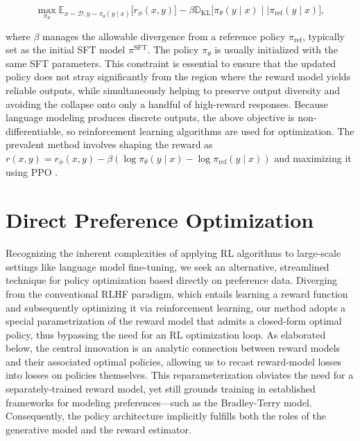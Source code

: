 \begin{equation}\label{eq:RL}
\max_{\pi_{\theta}}  \mathbb{E}_{x\sim \mathcal{D}, y\sim \pi_{\theta}(y \mid x)}\bigl[r_{\phi}(x, y)\bigr] - \beta\mathbb{D}_{\textrm{KL}}\bigl[\pi_{\theta}(y\mid x)\mid \mid \pi_\text{ref}(y\mid x)\bigr],
\end{equation}

where $\beta$ manages the allowable divergence from a reference policy $\pi_\text{ref}$, typically set as the initial SFT model $\pi^\text{SFT}$. The policy $\pi_\theta$ is usually initialized with the same SFT parameters. This constraint is essential to ensure that the updated policy does not stray significantly from the region where the reward model yields reliable outputs, while simultaneously helping to preserve output diversity and avoiding the collapse onto only a handful of high-reward responses. Because language modeling produces discrete outputs, the above objective is non-differentiable, so reinforcement learning algorithms are used for optimization. The prevalent method \citep{ziegler2020finetuning, stiennon2022learning, bai2022training, ouyang2022training} involves shaping the reward as ${r(x, y) = r_{\phi}(x, y) -\beta (\log \pi_{\theta}(y\mid x) - \log \pi_\text{ref}(y\mid x))}$ and maximizing it using PPO \cite{schulman2017proximal}.

\section{Direct Preference Optimization}\label{sec:DPO}

Recognizing the inherent complexities of applying RL algorithms to large-scale settings like language model fine-tuning, we seek an alternative, streamlined technique for policy optimization based directly on preference data. Diverging from the conventional RLHF paradigm, which entails learning a reward function and subsequently optimizing it via reinforcement learning, our method adopts a special parametrization of the reward model that admits a closed-form optimal policy, thus bypassing the need for an RL optimization loop. As elaborated below, the central innovation is an analytic connection between reward models and their associated optimal policies, allowing us to recast reward-model losses into losses on policies themselves. This reparameterization obviates the need for a separately-trained reward model, yet still grounds training in established frameworks for modeling preferences—such as the Bradley-Terry model. Consequently, the policy architecture implicitly fulfills both the roles of the generative model and the reward estimator.

